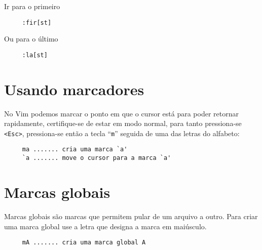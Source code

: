 Ir para o primeiro

\begin{verbatim}
     :fir[st]
\end{verbatim}

Ou para o último

\begin{verbatim}
     :la[st]
\end{verbatim}

\section{Usando marcadores}
\label{Usando marcadores}

No Vim podemos marcar o ponto em que o cursor está para poder retornar
rapidamente, certifique-se de estar em modo normal, para tanto pressiona-se \verb+<Esc>+,
pressiona-se então a tecla ``\verb+m+'' seguida de uma das letras do alfabeto:

\begin{verbatim}
     ma ....... cria uma marca `a'
     `a ....... move o cursor para a marca `a'
\end{verbatim}

\section{Marcas globais}
\label{Marcas globais}
Marcas globais são marcas que permitem pular de um arquivo a outro.
Para criar uma marca global use a letra que designa a marca em
maiúsculo.

\begin{verbatim}
     mA ....... cria uma marca global A
\end{verbatim}

